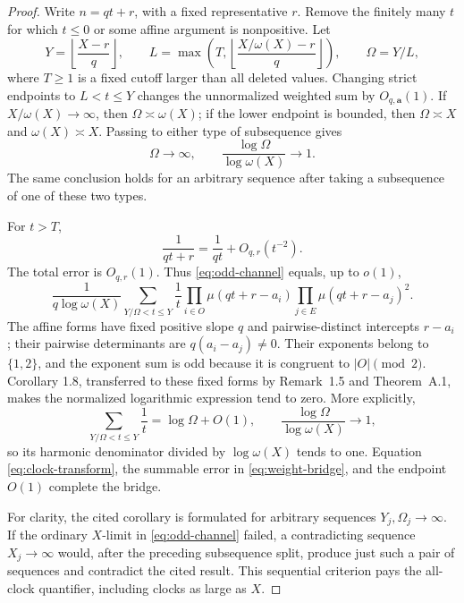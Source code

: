 \documentclass[11pt]{article}
\theoremstyle{definition}
\theoremstyle{remark}
\newcommand{\mob}{\mu}
\begin{document}
\begin{proof}
Write \(n=qt+r\), with a fixed representative \(r\).  Remove the finitely
many \(t\) for which \(t\leq0\) or some affine argument is nonpositive.
Let
\[
 Y=\left\lfloor\frac{X-r}{q}\right\rfloor,\qquad
 L=\max\!\left(T,\left\lfloor\frac{X/\omega(X)-r}{q}\right\rfloor\right),
 \qquad \Omega=Y/L,
\]
where \(T\geq1\) is a fixed cutoff larger than all deleted values.
Changing strict endpoints to \(L<t\leq Y\) changes the unnormalized
weighted sum by \(O_{q,\mathbf a}(1)\).  If
\(X/\omega(X)\to\infty\), then \(\Omega\asymp\omega(X)\); if the lower
endpoint is bounded, then \(\Omega\asymp X\) and
\(\omega(X)\asymp X\).  Passing to either type of subsequence gives
\begin{equation}
 \Omega\longrightarrow\infty,\qquad
 \frac{\log\Omega}{\log\omega(X)}\longrightarrow1.
 \label{eq:clock-transform}
\end{equation}
The same conclusion holds for an arbitrary sequence after taking a
subsequence of one of these two types.

For \(t>T\),
\begin{equation}
 \frac1{qt+r}=\frac1{qt}+O_{q,r}(t^{-2}).
 \label{eq:weight-bridge}
\end{equation}
The total error is \(O_{q,r}(1)\).  Thus \eqref{eq:odd-channel} equals,
up to \(o(1)\),
\begin{equation}
 \frac1{q\log\omega(X)}
 \sum_{Y/\Omega<t\leq Y}\frac1t
 \prod_{i\in O}\mob(qt+r-a_i)
 \prod_{j\in E}\mob(qt+r-a_j)^2.
 \label{eq:affine-window}
\end{equation}
The affine forms have fixed positive slope \(q\) and pairwise-distinct
intercepts \(r-a_i\); their pairwise determinants are
\(q(a_i-a_j)\neq0\).  Their exponents belong to \(\{1,2\}\), and the
exponent sum is odd because it is congruent to \(|O|\pmod2\).  Corollary
1.8, transferred to these fixed forms by Remark~1.5 and Theorem~A.1, makes
the normalized logarithmic expression tend to zero.  More explicitly,
\[
 \sum_{Y/\Omega<t\leq Y}\frac1t=\log\Omega+O(1),
 \qquad \frac{\log\Omega}{\log\omega(X)}\longrightarrow1,
\]
so its harmonic denominator divided by \(\log\omega(X)\) tends to one.
Equation
\eqref{eq:clock-transform}, the summable error in
\eqref{eq:weight-bridge}, and the endpoint \(O(1)\) complete the bridge.

For clarity, the cited corollary is formulated for arbitrary sequences
\(Y_j,\Omega_j\to\infty\).  If the ordinary \(X\)-limit in
\eqref{eq:odd-channel} failed, a contradicting sequence \(X_j\to\infty\)
would, after the preceding subsequence split, produce just such a pair of
sequences and contradict the cited result.  This sequential criterion pays
the all-clock quantifier, including clocks as large as \(X\).
\end{proof}
\end{document}
